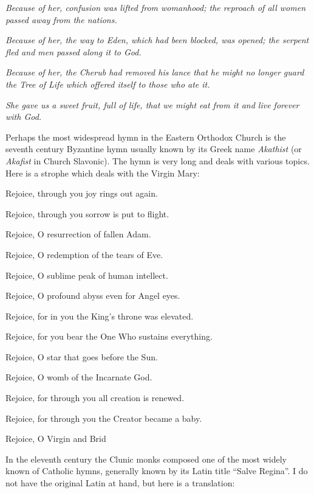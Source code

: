 \begin{quotex}
\emph{Because of her, confusion was lifted from womanhood; the reproach of all women passed away from the nations.}

\emph{Because of her, the way to Eden, which had been blocked, was opened; the serpent fled and men passed along it to God.}

\emph{Because of her, the Cherub had removed his lance that he might no longer guard the Tree of Life which offered itself to those who ate it.}

\emph{She gave us a sweet fruit, full of life, that we might eat from it and live forever with God.}

\end{quotex}


Perhaps the most widespread hymn in the Eastern Orthodox Church is the seventh century Byzantine hymn usually known by its Greek name \emph{Akathist} (or \emph{Akafist} in Church Slavonic). The hymn is very long and deals with various topics. Here is a strophe which deals with the Virgin Mary:

\begin{quotex}
Rejoice, through you joy rings out again.

Rejoice, through you sorrow is put to flight.

Rejoice, O resurrection of fallen Adam.

Rejoice, O redemption of the tears of Eve.

Rejoice, O sublime peak of human intellect.

Rejoice, O profound abyss even for Angel eyes.

Rejoice, for in you the King's throne was elevated.

Rejoice, for you bear the One Who sustains everything.

Rejoice, O star that goes before the Sun.

Rejoice, O womb of the Incarnate God.

Rejoice, for through you all creation is renewed.

Rejoice, for through you the Creator became a baby.

Rejoice, O Virgin and Brid
\end{quotex}


In the eleventh century the Clunic monks composed one of the most widely known of Catholic hymns, generally known by its Latin title ``Salve Regina''. I do not have the original Latin at hand, but here is a translation:

